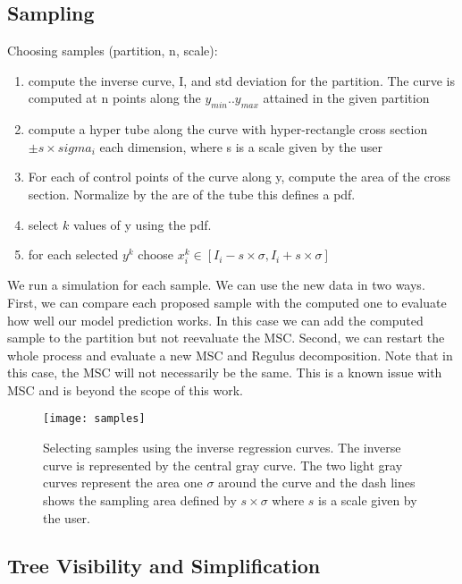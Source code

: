 \subsection{Sampling}
Choosing samples (partition, n, scale): 
\begin{enumerate}
    \item compute the inverse curve, I, and std deviation for the partition. The curve is computed at n points along the $y_{min} .. y_{max}$ attained in the given partition
    \item compute a hyper tube along the curve with hyper-rectangle cross section $\pm s \times sigma_i$ each dimension, where s is a scale given by the user 
    \item For each of control points of the curve along y, compute the area of the cross section. Normalize by the are of the tube this defines a pdf.
    \item select $k$ values of y using the pdf.
    \item for each selected $y^k$ choose $x_i^k \in [I_i - s \times \sigma, I_i + s \times \sigma]$ 
\end{enumerate}

We run a simulation for each sample. We can use the new data in two ways. First, we can compare each proposed sample with the computed one to evaluate how well our model prediction works. In this case we can add the computed sample to the partition but not reevaluate the MSC. Second, we can restart the whole process and evaluate a new MSC and Regulus decomposition. Note that in this case, the MSC will not necessarily be the same. This is a known issue with MSC and is beyond the scope of this work. 

\begin{figure}[thb]
    \begin{center}
     \texttt{[image: samples]}
    \caption{Selecting samples using the inverse regression curves. The inverse curve is represented by the central gray curve. The two light gray curves represent the area one $\sigma$ around the curve and the dash lines shows the sampling area defined by $s \times \sigma$ where $s$ is a scale given by the user.}
    \label{fig:samples}
    \end{center}
\end{figure}

\subsection{Tree Visibility and Simplification}

